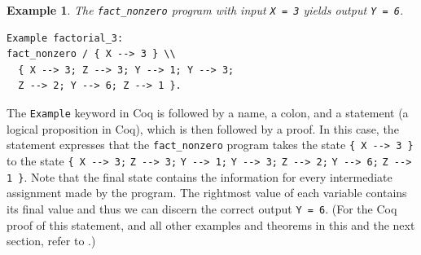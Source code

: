 \documentclass[compsoc,conference,a4paper,10pt,times]{IEEEtran}
\newtheorem{example}[theorem]{Example}
\begin{document}
\begin{example}\label{firstoff}
    The \texttt{fact\_nonzero} program with input \texttt{X = 3} yields output \texttt{Y = 6}.  
\begin{verbatim}
Example factorial_3: 
fact_nonzero / { X --> 3 } \\
  { X --> 3; Z --> 3; Y --> 1; Y --> 3; 
  Z --> 2; Y --> 6; Z --> 1 }.
\end{verbatim}
\end{example}
    The \texttt{Example} keyword in Coq is followed by a name, a colon, and a statement (a logical proposition in Coq), which is then followed by a proof. In this case, the statement expresses that the \texttt{fact\_nonzero} program takes the state \verb|{ X --> 3 }| to the state \verb|{ X --> 3;| \verb|Z --> 3;| \verb|Y --> 1;| \verb|Y --> 3;| \verb|Z --> 2;| \verb|Y --> 6;| \verb|Z --> 1 }|.
    Note that the final state contains the information for every intermediate assignment made by the program.  The rightmost value of each variable contains its final value and thus we can discern the correct output \texttt{Y = 6}.  
    (For the Coq proof of this statement, and all other examples and theorems in this and the next section, refer to \cite{WeiRepo}.)
    
%    
    
\end{document}
